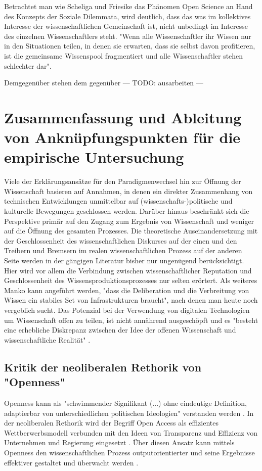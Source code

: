 Betrachtet man wie Scheliga und Friesike das Phänomen Open Science an Hand des Konzepts der Soziale Dilemmata, wird deutlich, dass das was im kollektives Interesse der wissenschaftlichen Gemeinschaft ist, nicht unbedingt im Interesse des einzelnen Wissenschaftlers steht. "Wenn alle Wissenschaftler ihr Wissen nur in den Situationen teilen, in denen sie erwarten, dass sie selbst davon profitieren, ist die gemeinsame Wissenspool fragmentiert und alle Wissenschaftler stehen schlechter dar"\cite{Scheliga_2014}. 

Demgegenüber stehen dem gegenüber  --- TODO: ausarbeiten ---


\section{Zusammenfassung und Ableitung von Anknüpfungspunkten für die empirische Untersuchung}
Viele der Erklärungsansätze für den Paradigmenwechsel hin zur Öffnung der Wissenschaft basieren auf Annahmen, in denen ein direkter Zusammenhang von technischen Entwicklungen unmittelbar auf (wissenschafts-)politische und kulturelle Bewegungen geschlossen werden. Darüber hinaus beschränkt sich die Perspektive primär auf den Zugang zum Ergebnis von Wissenschaft und weniger auf die Öffnung des gesamten Prozesses. Die theoretische Auseinandersetzung mit der Geschlossenheit des wissenschaftlichen Diskurses auf der einen und den Treibern und Bremsern im realen wissenschaftlichen Prozess auf der anderen Seite werden in der gängigen Literatur bisher nur ungenügend berücksichtigt. Hier wird vor allem die Verbindung zwischen wissenschaftlicher Reputation und Geschlossenheit des Wissensproduktionsprozesses nur selten erörtert. Als weiteres Manko kann angeführt werden, "dass die Deliberation und die Verbreitung von Wissen ein stabiles Set von Infrastrukturen braucht"\cite{kelty_2004}, nach denen man heute noch vergeblich sucht. Das Potenzial bei der Verwendung von digitalen Technologien um Wissenschaft offen zu teilen, ist nicht annährend ausgeschöpft und es "besteht eine erhebliche Diskrepanz zwischen der Idee der offenen Wissenschaft und wissenschaftliche Realität" \cite{Scheliga_2014}.




\subsection{Kritik der neoliberalen Rethorik von "Openness"}

Openness kann als "schwimmender Signifikant (...) ohne eindeutige Definition, adaptierbar von unterschiedlichen politischen Ideologien" verstanden werden \cite{Adema_2014_open_access}. In der neoliberalen Rethorik wird der Begriff Open Access als effizientes Wettberwerbsmodell verbunden mit den Ideen von Transparenz und Effizienz von Unternehmen und Regierung eingesetzt \cite{tkacz_2012_open}. Über diesen Ansatz kann mittels Openness den wissenschaftlichen Prozess outputorientierter und seine Ergebnisse effektiver gestaltet und überwacht werden \cite{adema_2010_oaoverview} . 


